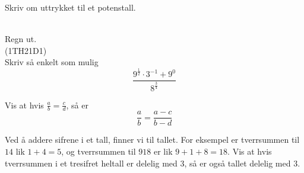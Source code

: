 Skriv om uttrykket til et potenstall. \os
{} \\[12pt]

 \\[12pt]


\newpage
{}
Regn ut.\os
{} \\[10pt]
\newpage
{} 
(1TH21D1) \\%
Skriv så enkelt som mulig
\[ \frac{9^{\frac{1}{2}}\cdot 3^{-1}+9^0}{8^{\frac{3}{4}}} \]

Vis at hvis $ \frac{a}{b}=\frac{c}{d} $, så er
\[ \frac{a}{b}=\frac{a-c}{b-d} \] 

Ved å addere sifrene i et tall, finner vi  til tallet. For eksempel er tverrsummen til $ 14 $ lik $ 1+4=5 $, og tverrsummen til $ 918 $ er lik $ 9+1+8=18 $. Vis at hvis tverrsummen i et tresifret heltall er delelig med 3, så er også tallet delelig med 3.\vsk




